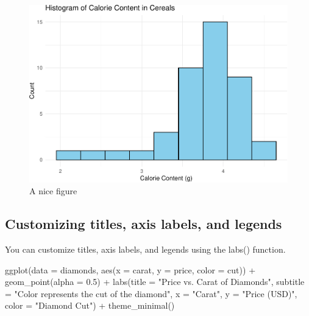 \documentclass[
]{book}
\newenvironment{Shaded}{\begin{snugshade}}{\end{snugshade}}
\newcommand{\AttributeTok}[1]{\textcolor[rgb]{0.77,0.63,0.00}{#1}}
\newcommand{\FloatTok}[1]{\textcolor[rgb]{0.00,0.00,0.81}{#1}}
\newcommand{\FunctionTok}[1]{\textcolor[rgb]{0.00,0.00,0.00}{#1}}
\newcommand{\NormalTok}[1]{#1}
\newcommand{\SpecialCharTok}[1]{\textcolor[rgb]{0.00,0.00,0.00}{#1}}
\newcommand{\StringTok}[1]{\textcolor[rgb]{0.31,0.60,0.02}{#1}}
\begin{document}
\begin{figure}
\includegraphics[width=1\linewidth]{graphformatting_files/figure-latex/unnamed-chunk-2-1} \caption{A nice figure}\label{fig:unnamed-chunk-2}
\end{figure}

\hypertarget{customizing-titles-axis-labels-and-legends}{%
\subsection{Customizing titles, axis labels, and legends}\label{customizing-titles-axis-labels-and-legends}}

You can customize titles, axis labels, and legends using the labs() function.

\begin{Shaded}
\begin{Highlighting}[]
\FunctionTok{ggplot}\NormalTok{(}\AttributeTok{data =}\NormalTok{ diamonds, }\FunctionTok{aes}\NormalTok{(}\AttributeTok{x =}\NormalTok{ carat, }\AttributeTok{y =}\NormalTok{ price, }\AttributeTok{color =}\NormalTok{ cut)) }\SpecialCharTok{+}
  \FunctionTok{geom\_point}\NormalTok{(}\AttributeTok{alpha =} \FloatTok{0.5}\NormalTok{) }\SpecialCharTok{+}
  \FunctionTok{labs}\NormalTok{(}\AttributeTok{title =} \StringTok{"Price vs. Carat of Diamonds"}\NormalTok{,}
       \AttributeTok{subtitle =} \StringTok{"Color represents the cut of the diamond"}\NormalTok{,}
       \AttributeTok{x =} \StringTok{"Carat"}\NormalTok{,}
       \AttributeTok{y =} \StringTok{"Price (USD)"}\NormalTok{,}
       \AttributeTok{color =} \StringTok{"Diamond Cut"}\NormalTok{) }\SpecialCharTok{+}
  \FunctionTok{theme\_minimal}\NormalTok{()}
\end{Highlighting}
\end{Shaded}
\end{document}
